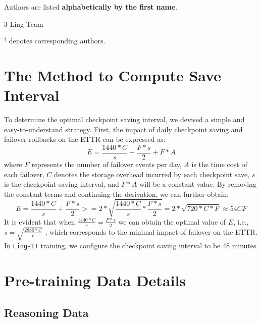 \documentclass[table]{gtech}
\theoremstyle{definition}
\begin{document}

\large{Authors are listed \textbf{alphabetically by the first name}.} 

\large{
\begin{multicols}{3}
\raggedcolumns
Ling Team\\
\end{multicols}}

$^{\dagger}$ denotes corresponding authors.

\clearpage




\appendix

\section{The Method to Compute Save Interval}\label{app:save_interval}
To determine the optimal checkpoint saving interval, we devised a simple and easy-to-understand strategy. First, the impact of daily checkpoint saving and failover rollbacks on the ETTR can be expressed as:
\begin{equation}
    E = \frac{1440 * C}{s} + \frac{F * s}{2} + F * A
\end{equation}
where $F$ represents the number of failover events per day, $A$ is the time cost of each failover, $C$ denotes the storage overhead incurred by each checkpoint save, $s$ is the checkpoint saving interval, and $F * A$ will be a constant value.
By removing the constant terms and continuing the derivation, we can further obtain:
\begin{equation}
    E = \frac{1440 * C}{s} + \frac{F*s}{2} >= 2*\sqrt{\frac{1440 * C}{s} * \frac{F*s}{2}} = 2* \sqrt{720*C*F} \approx 54CF
\end{equation}
It is evident that when $\frac{1440 * C}{s} = \frac{F*s}{2}$ we can obtain the optimal value of $E$, i.e., $s = \sqrt{\frac{2880*C}{F}}$ , which corresponds to the minimal impact of failover on the ETTR. In \texttt{Ling-1T} training, we configure the checkpoint saving interval to be 48 minutes

\section{Pre-training Data Details}
\subsection{Reasoning Data}
\end{document}
